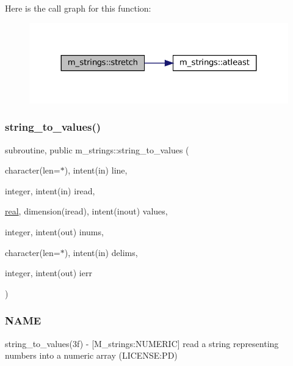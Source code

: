 Here is the call graph for this function\+:\nopagebreak
\begin{figure}[H]
\begin{center}
\leavevmode
\includegraphics[width=324pt]{namespacem__strings_aa67b36ec70dbad84672d3069882929c5_cgraph}
\end{center}
\end{figure}
\mbox{\label{namespacem__strings_af3767887ce5c2373a6d9061ea6664bfc}} 
\subsubsection{\texorpdfstring{string\+\_\+to\+\_\+values()}{string\_to\_values()}}
{\footnotesize\ttfamily subroutine, public m\+\_\+strings\+::string\+\_\+to\+\_\+values (\begin{DoxyParamCaption}\item[{character(len=$\ast$), intent(in)}]{line,  }\item[{integer, intent(in)}]{iread,  }\item[{\mbox{\hyperlink{interfacem__strings_1_1real}{real}}, dimension(iread), intent(inout)}]{values,  }\item[{integer, intent(out)}]{inums,  }\item[{character(len=$\ast$), intent(in)}]{delims,  }\item[{integer, intent(out)}]{ierr }\end{DoxyParamCaption})}



\subsubsection*{N\+A\+ME}

string\+\_\+to\+\_\+values(3f) -\/ \mbox{[}M\+\_\+strings\+:N\+U\+M\+E\+R\+IC\mbox{]} read a string representing numbers into a numeric array (L\+I\+C\+E\+N\+SE\+:PD) 

